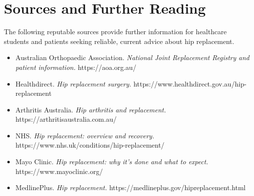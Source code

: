 \section*{Sources and Further Reading}
The following reputable sources provide further information for healthcare students and patients seeking reliable, current advice about hip replacement.

\begin{itemize}
    \item Australian Orthopaedic Association. \textit{National Joint Replacement Registry and patient information.} https://aoa.org.au/
    \item Healthdirect. \textit{Hip replacement surgery.} https://www.healthdirect.gov.au/hip-replacement
    \item Arthritis Australia. \textit{Hip arthritis and replacement.} https://arthritisaustralia.com.au/
    \item NHS. \textit{Hip replacement: overview and recovery.} https://www.nhs.uk/conditions/hip-replacement/
    \item Mayo Clinic. \textit{Hip replacement: why it's done and what to expect.} https://www.mayoclinic.org/
    \item MedlinePlus. \textit{Hip replacement.} https://medlineplus.gov/hipreplacement.html
\end{itemize}
